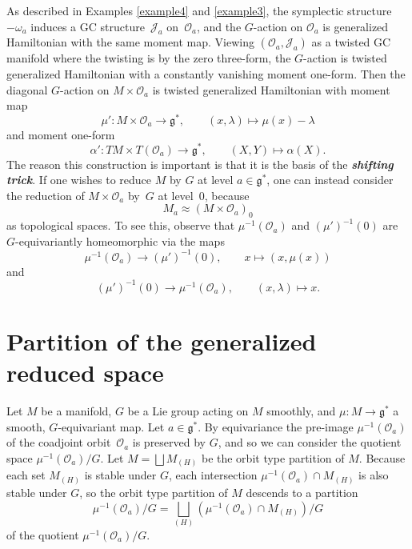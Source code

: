 \documentclass[11pt]{article}
\numberwithin{equation}{section}
\newcommand{\deff}[1]{\textbf{\emph{#1}}}
\newcommand{\func}[3]{#1 \colon #2 \to #3}
\newcommand{\tang}{T}
\begin{document}
As described in Examples \ref{example4} and \ref{example3}, the symplectic structure $-\omega_{a}$ induces a GC structure~$\mathcal{J}_{a}$ on~$\mathcal{O}_{a}$, and the $G$-action on $\mathcal{O}_{a}$ is generalized Hamiltonian with the same moment map.  Viewing $(\mathcal{O}_{a},\mathcal{J}_{a})$ as a twisted GC manifold where the twisting is by the zero three-form, the $G$-action is twisted generalized Hamiltonian with a constantly vanishing moment one-form.  Then the diagonal $G$-action on $M \times \mathcal{O}_{a}$ is twisted generalized Hamiltonian with moment map
\[
  \func{\mu'}{M \times \mathcal{O}_{a}}{\mathfrak{g}^*},
  \qquad (x,\lambda) \mapsto \mu(x) - \lambda
\]
and moment one-form
\[
  \func{\alpha'}{
  \tang M \times \tang (\mathcal{O}_{a})}{
  \mathfrak{g}^*},
  \qquad
  (X,Y) \mapsto \alpha(X).
\]
The reason this construction is important is that it is the basis of the \deff{shifting trick}.  If one wishes to reduce $M$ by $G$ at level $a \in \mathfrak{g}^*$, one can instead consider the reduction of $M \times \mathcal{O}_{a}$ by~$G$ at level~$0$, because
\[
  M_a \approx (M \times \mathcal{O}_{a})_0
\]
as topological spaces.
To see this, observe that $\mu^{-1}(\mathcal{O}_a)$ and $(\mu')^{-1}(0)$ are $G$-equivariantly homeomorphic via the maps
\[
  \mu^{-1}(\mathcal{O}_a) \to (\mu')^{-1}(0),
  \qquad
  x \mapsto \left(x, \mu(x) \right)
\]
and
\[
  (\mu')^{-1}(0) \to \mu^{-1}(\mathcal{O}_a),
  \qquad
  (x, \lambda) \mapsto x.
\]


\section{Partition of the generalized reduced space}\label{section4}


Let $M$ be a manifold, $G$ be a Lie group acting on $M$ smoothly, and $\func{\mu}{M}{\mathfrak{g}^*}$ a smooth, $G$-equivariant map.
Let $a \in \mathfrak{g}^*$.
By equivariance the pre-image $\mu^{-1}(\mathcal{O}_a)$ of the coadjoint orbit~$\mathcal{O}_a$ is preserved by $G$, and so we can consider the quotient space $\mu^{-1}(\mathcal{O}_a) / G$.
Let $M = \bigsqcup M_{(H)}$ be the orbit type partition of $M$.
Because each set $M_{(H)}$ is stable under $G$, each intersection $\mu^{-1}(\mathcal{O}_a) \cap M_{(H)}$ is also stable under $G$,
so the orbit type partition of $M$ descends to a partition
\[
  \mu^{-1}(\mathcal{O}_a) / G
  = \bigsqcup_{(H)} \left( \mu^{-1}(\mathcal{O}_a) \cap M_{(H)} \right) / G
\]
of the quotient $\mu^{-1}(\mathcal{O}_a) / G$.
\end{document}
